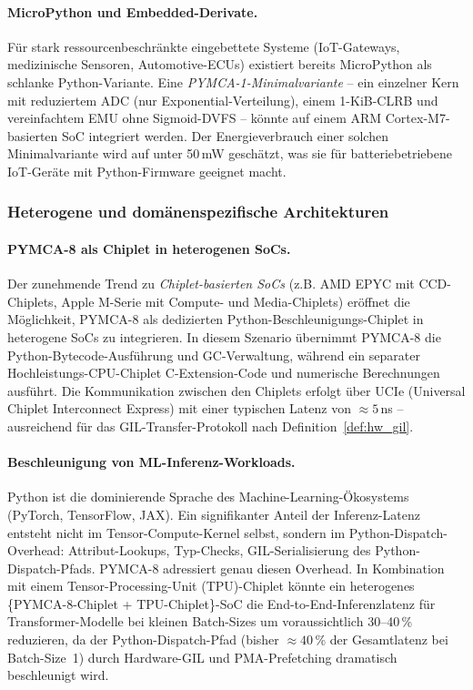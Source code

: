 ﻿\documentclass[a4paper,12pt]{scrreprt}
\theoremstyle{definition}
\begin{document}
	\paragraph{MicroPython und Embedded-Derivate.}
	Für stark ressourcenbeschränkte eingebettete Systeme (IoT-Gateways,
	medizinische Sensoren, Automotive-ECUs) existiert bereits MicroPython als
	schlanke Python-Variante. Eine \emph{PYMCA-1-Minimalvariante} -- ein einzelner
	Kern mit reduziertem ADC (nur Exponential-Verteilung), einem 1-KiB-CLRB und
	vereinfachtem EMU ohne Sigmoid-DVFS -- könnte auf einem ARM Cortex-M7-basierten
	SoC integriert werden. Der Energieverbrauch einer solchen Minimalvariante
	wird auf unter 50\,mW geschätzt, was sie für batteriebetriebene IoT-Geräte
	mit Python-Firmware geeignet macht.

	\subsubsection{Heterogene und domänenspezifische Architekturen}

	\paragraph{PYMCA-8 als Chiplet in heterogenen SoCs.}
	Der zunehmende Trend zu \emph{Chiplet-basierten SoCs} (z.B. AMD EPYC mit
	CCD-Chiplets, Apple M-Serie mit Compute- und Media-Chiplets) eröffnet die
	Möglichkeit, PYMCA-8 als dedizierten Python-Beschleunigungs-Chiplet in
	heterogene SoCs zu integrieren. In diesem Szenario übernimmt PYMCA-8 die
	Python-Bytecode-Ausführung und GC-Verwaltung, während ein separater
	Hochleistungs-CPU-Chiplet C-Extension-Code und numerische Berechnungen
	ausführt. Die Kommunikation zwischen den Chiplets erfolgt über UCIe
	(Universal Chiplet Interconnect Express) mit einer typischen Latenz von
	$\approx 5$\,ns -- ausreichend für das GIL-Transfer-Protokoll nach
	Definition~\ref{def:hw_gil}.

	\paragraph{Beschleunigung von ML-Inferenz-Workloads.}
	Python ist die dominierende Sprache des Machine-Learning-Ökosystems
	(PyTorch, TensorFlow, JAX). Ein signifikanter Anteil der Inferenz-Latenz
	entsteht nicht im Tensor-Compute-Kernel selbst, sondern im Python-Dispatch-Overhead:
	Attribut-Lookups, Typ-Checks, GIL-Serialisierung des Python-Dispatch-Pfads.
	PYMCA-8 adressiert genau diesen Overhead. In Kombination mit einem
	Tensor-Processing-Unit (TPU)-Chiplet könnte ein heterogenes
	\{PYMCA-8-Chiplet + TPU-Chiplet\}-SoC die End-to-End-Inferenzlatenz
	für Transformer-Modelle bei kleinen Batch-Sizes um voraussichtlich 30--40\,\%
	reduzieren, da der Python-Dispatch-Pfad (bisher $\approx 40$\,\% der Gesamtlatenz
	bei Batch-Size~1) durch Hardware-GIL und PMA-Prefetching dramatisch beschleunigt wird.
\end{document}
